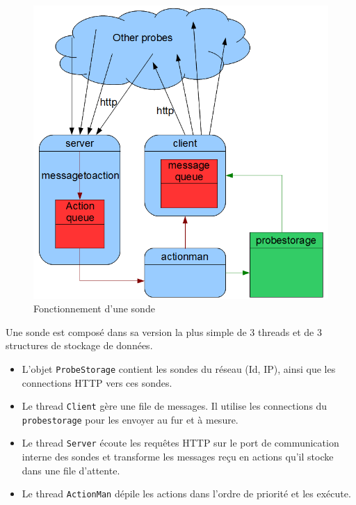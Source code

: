 \documentclass[a4paper,11pt]{article}
\newcommand{\cd}[1]{\texttt{#1}}
\begin{document}
\begin{figure}[!h]
\centering\includegraphics[width=\linewidth]{img/graphDiscovery.png}
\caption{Fonctionnement d'une sonde}
\end{figure}

Une sonde est composé dans sa version la plus simple de 3 threads et de 3 structures de stockage de données.
\begin{itemize}
\item L'objet \cd{ProbeStorage} contient les sondes du réseau (Id, IP), ainsi que les connections HTTP vers ces sondes.
\item Le thread \cd{Client} gère une file de messages. Il utilise les connections du \cd{probestorage} pour les envoyer au fur et à mesure.
\item Le thread \cd{Server} écoute les requêtes HTTP sur le port de communication interne des sondes et transforme les messages reçu en actions qu'il stocke dans une file d'attente.
\item Le thread \cd{ActionMan} dépile les actions dans l'ordre de priorité et les exécute.
\end{itemize}


\newpage
\end{document}
